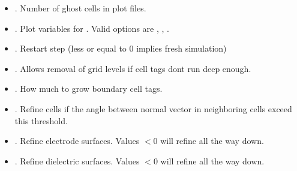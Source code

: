 \documentclass[letterpaper,10pt,english]{sphinxmanual}
\begin{document}
\begin{itemize}
\item {} 
. Number of ghost cells in plot files.

\item {} 
. Plot variables for . Valid options are , , .

\item {} 
. Restart step (less or equal to 0 implies fresh simulation)

\item {} 
. Allows removal of grid levels if cell tags dont run deep enough.

\item {} 
. How much to grow boundary cell tags.

\item {} 
. Refine cells if the angle between normal vector in neighboring cells exceed this threshold.

\item {} 
. Refine electrode surfaces. Values \(< 0\) will refine all the way down.

\item {} 
. Refine dielectric surfaces. Values \(< 0\) will refine all the way down.

\end{itemize}
\end{document}

